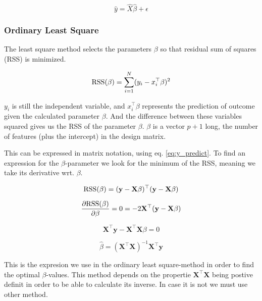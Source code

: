 \documentclass[a4paper,12pt, english]{article}
\begin{document}
\begin{equation} \label{eq:y_predict}
\hat{y} = \hat{X} \hat{\beta} + \epsilon
\end{equation}


\subsubsection{Ordinary Least Square} \label{sec:OLS}

The least square method selects the parameters $\beta$ so that residual sum of squares (RSS) is minimized.

\begin{equation*}
\textnormal{RSS}(\beta) = \sum_{i=1}^{N} (y_i - x_i^{\top}\beta)^2
\end{equation*}

$y_i$ is still the independent variable, and $x_i^{\top}\beta$ represents the prediction of outcome given the calculated parameter $\beta$. And the difference between these variables squared gives us the RSS of the parameter $\beta$. $\beta$ is a vector $p + 1$ long, the number of features (plus the intercept) in the design matrix. 

This can be expressed in matrix notation, using eq. \ref{eq:y_predict}. To find an expression for the $\beta$-parameter we look for the minimum of the RSS, meaning we take its derivative wrt. $\beta$.

\begin{equation} \label{RSS}
\textnormal{RSS}(\beta) = (\mathbf{y} - \mathbf{X}\beta)^{\top}(\mathbf{y} - \mathbf{X}\beta)
\end{equation}

\begin{equation*}
\frac{\partial \textnormal{RSS}(\beta)}{\partial \beta} = 0 = -2 \mathbf{X}^{\top}(\mathbf{y} - \mathbf{X}\beta)
\end{equation*}

\begin{equation*}
\mathbf{X}^{\top}\mathbf{y} - \mathbf{X}^{\top}\mathbf{X} \beta = 0
\end{equation*}

\begin{equation} \label{eq:beta}
\hat{\beta} = (\mathbf{X}^{\top}\mathbf{X})^{-1}\mathbf{X}^{\top}\mathbf{y}
\end{equation}

This is the expresion we use in the ordinary least square-method in order to find the optimal $\beta$-values. This method depends on the propertie $\mathbf{X^{\top}}\mathbf{X}$ being postive definit in order to be able to calculate its inverse. In case it is not we must use other method.
\end{document}

